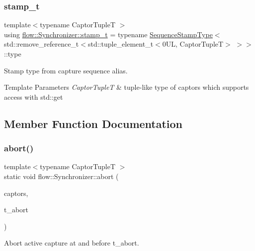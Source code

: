 \subsubsection{\texorpdfstring{stamp\+\_\+t}{stamp\_t}}
{\footnotesize\ttfamily template$<$typename Captor\+TupleT $>$ \\
using \hyperlink{classflow_1_1_synchronizer_a2a443abb40ad2413e6d5f7a7f3cfe4a7}{flow\+::\+Synchronizer\+::stamp\+\_\+t} =  typename \hyperlink{structflow_1_1_sequence_stamp_type}{Sequence\+Stamp\+Type}$<$std\+::remove\+\_\+reference\+\_\+t$<$std\+::tuple\+\_\+element\+\_\+t$<$0\+U\+L, Captor\+Tuple\+T$>$ $>$$>$\+::type}



Stamp type from capture sequence alias. 


\begin{DoxyTemplParams}{Template Parameters}
{\em Captor\+TupleT} & tuple-\/like type of captors which supports access with {\ttfamily std\+::get} \\
\hline
\end{DoxyTemplParams}


\subsection{Member Function Documentation}
\mbox{\label{classflow_1_1_synchronizer_a065371da9acc09e3459ca2c6096db1b7}} 
\subsubsection{\texorpdfstring{abort()}{abort()}}
{\footnotesize\ttfamily template$<$typename Captor\+TupleT $>$ \\
static void flow\+::\+Synchronizer\+::abort (\begin{DoxyParamCaption}\item[{Captor\+TupleT \&\&}]{captors,  }\item[{const \hyperlink{classflow_1_1_synchronizer_a0f1e7062475c9492191e29b26d09106c}{stamp\+\_\+arg\+\_\+t}$<$ Captor\+TupleT $>$}]{t\+\_\+abort }\end{DoxyParamCaption})\hspace{0.3cm}{\ttfamily [static]}}



Abort active capture at and before {\ttfamily t\+\_\+abort}. 

